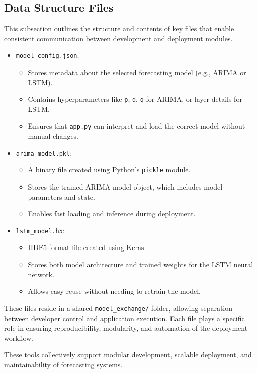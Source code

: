 \subsection{Data Structure Files}

This subsection outlines the structure and contents of key files that enable consistent communication between development and deployment modules.

\begin{itemize}
	\item \texttt{model\_config.json}:
	\begin{itemize}
		\item Stores metadata about the selected forecasting model (e.g., ARIMA or LSTM).
		\item Contains hyperparameters like \texttt{p}, \texttt{d}, \texttt{q} for ARIMA, or layer details for LSTM.
		\item Ensures that \texttt{app.py} can interpret and load the correct model without manual changes.
	\end{itemize}
	
	\item \texttt{arima\_model.pkl}:
	\begin{itemize}
		\item A binary file created using Python’s \texttt{pickle} module.
		\item Stores the trained ARIMA model object, which includes model parameters and state.
		\item Enables fast loading and inference during deployment.
	\end{itemize}
	
	\item \texttt{lstm\_model.h5}:
	\begin{itemize}
		\item HDF5 format file created using Keras.
		\item Stores both model architecture and trained weights for the LSTM neural network.
		\item Allows easy reuse without needing to retrain the model.
	\end{itemize}
\end{itemize}

These files reside in a shared \texttt{model\_exchange/} folder, allowing separation between developer control and application execution. Each file plays a specific role in ensuring reproducibility, modularity, and automation of the deployment workflow.


These tools collectively support modular development, scalable deployment, and maintainability of forecasting systems.


